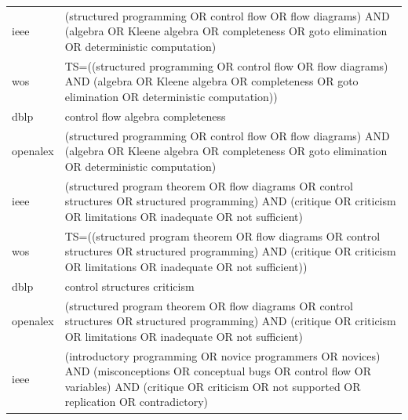\documentclass{article}
\begin{document}
\begin{longtable}{lp{10cm}}
ieee & (\textquotedbl{}structured programming\textquotedbl{} OR \textquotedbl{}control flow\textquotedbl{} OR \textquotedbl{}flow diagrams\textquotedbl{}) AND (algebra OR \textquotedbl{}Kleene algebra\textquotedbl{} OR completeness OR \textquotedbl{}goto elimination\textquotedbl{} OR \textquotedbl{}deterministic computation\textquotedbl{}) \\
wos & TS=((\textquotedbl{}structured programming\textquotedbl{} OR \textquotedbl{}control flow\textquotedbl{} OR \textquotedbl{}flow diagrams\textquotedbl{}) AND (algebra OR \textquotedbl{}Kleene algebra\textquotedbl{} OR completeness OR \textquotedbl{}goto elimination\textquotedbl{} OR \textquotedbl{}deterministic computation\textquotedbl{})) \\
dblp & control flow algebra completeness \\
openalex & (\textquotedbl{}structured programming\textquotedbl{} OR \textquotedbl{}control flow\textquotedbl{} OR \textquotedbl{}flow diagrams\textquotedbl{}) AND (algebra OR \textquotedbl{}Kleene algebra\textquotedbl{} OR completeness OR \textquotedbl{}goto elimination\textquotedbl{} OR \textquotedbl{}deterministic computation\textquotedbl{}) \\
ieee & (\textquotedbl{}structured program theorem\textquotedbl{} OR \textquotedbl{}flow diagrams\textquotedbl{} OR \textquotedbl{}control structures\textquotedbl{} OR \textquotedbl{}structured programming\textquotedbl{}) AND (critique OR criticism OR limitations OR inadequate OR \textquotedbl{}not sufficient\textquotedbl{}) \\
wos & TS=((\textquotedbl{}structured program theorem\textquotedbl{} OR \textquotedbl{}flow diagrams\textquotedbl{} OR \textquotedbl{}control structures\textquotedbl{} OR \textquotedbl{}structured programming\textquotedbl{}) AND (critique OR criticism OR limitations OR inadequate OR \textquotedbl{}not sufficient\textquotedbl{})) \\
dblp & control structures criticism \\
openalex & (\textquotedbl{}structured program theorem\textquotedbl{} OR \textquotedbl{}flow diagrams\textquotedbl{} OR \textquotedbl{}control structures\textquotedbl{} OR \textquotedbl{}structured programming\textquotedbl{}) AND (critique OR criticism OR limitations OR inadequate OR \textquotedbl{}not sufficient\textquotedbl{}) \\
ieee & (\textquotedbl{}introductory programming\textquotedbl{} OR \textquotedbl{}novice programmers\textquotedbl{} OR novices) AND (misconceptions OR \textquotedbl{}conceptual bugs\textquotedbl{} OR \textquotedbl{}control flow\textquotedbl{} OR variables) AND (critique OR criticism OR \textquotedbl{}not supported\textquotedbl{} OR replication OR contradictory) \\

\end{longtable}
\end{document}
